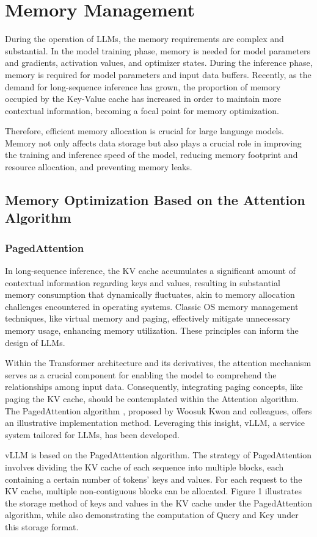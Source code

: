 \documentclass[conference]{IEEEtran}
\begin{document}
\section{Memory Management}
During the operation of LLMs, the memory requirements are complex and substantial. In the model training phase, memory is needed for model parameters and gradients, activation values, and optimizer states. During the inference phase, memory is required for model parameters and input data buffers. Recently, as the demand for long-sequence inference has grown, the proportion of memory occupied by the Key-Value cache has increased in order to maintain more contextual information, becoming a focal point for memory optimization.

Therefore, efficient memory allocation is crucial for large language models. Memory not only affects data storage but also plays a crucial role in improving the training and inference speed of the model, reducing memory footprint and resource allocation, and preventing memory leaks.
\subsection{Memory Optimization Based on the Attention Algorithm}
\subsubsection{PagedAttention}
In long-sequence inference, the KV cache accumulates a significant amount of contextual information regarding keys and values, resulting in substantial memory consumption that dynamically fluctuates, akin to memory allocation challenges encountered in operating systems. Classic OS memory management techniques, like virtual memory and paging, effectively mitigate unnecessary memory usage, enhancing memory utilization. These principles can inform the design of LLMs.

Within the Transformer architecture and its derivatives, the attention mechanism serves as a crucial component for enabling the model to comprehend the relationships among input data. Consequently, integrating paging concepts, like paging the KV cache, should be contemplated within the Attention algorithm. The PagedAttention algorithm \cite{b1}, proposed by Woosuk Kwon and colleagues, offers an illustrative implementation method. Leveraging this insight, vLLM, a service system tailored for LLMs, has been developed.

vLLM is based on the PagedAttention algorithm. The strategy of PagedAttention involves dividing the KV cache of each sequence into multiple blocks, each containing a certain number of tokens' keys and values. For each request to the KV cache, multiple non-contiguous blocks can be allocated. Figure 1 illustrates the storage method of keys and values in the KV cache under the PagedAttention algorithm, while also demonstrating the computation of Query and Key under this storage format.
\end{document}
